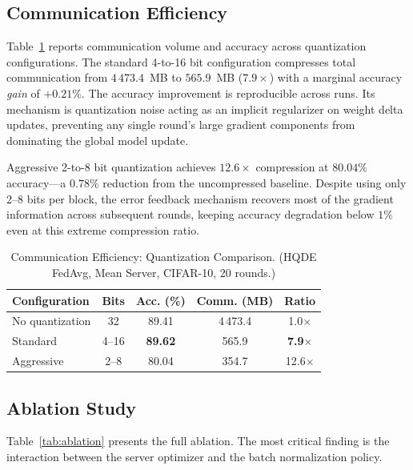 \documentclass[journal,twoside]{IEEEtran}
\newcommand{\hqde}{\mbox{HQDE}\xspace}
\begin{document}
\subsection{Communication Efficiency}
\label{sec:comm}

Table~\ref{tab:quant} reports communication volume and accuracy across
quantization configurations. The standard 4-to-16 bit configuration
compresses total communication from $4\,473.4$~MB to $565.9$~MB
($7.9\times$) with a marginal accuracy \emph{gain} of $+0.21\%$. The
accuracy improvement is reproducible across runs. Its mechanism is
quantization noise acting as an implicit regularizer on weight delta
updates, preventing any single round's large gradient components from
dominating the global model update.

Aggressive 2-to-8 bit quantization achieves $12.6\times$ compression
at $80.04\%$ accuracy---a $0.78\%$ reduction from the uncompressed
baseline. Despite using only 2--8 bits per block, the error feedback
mechanism recovers most of the gradient information across subsequent
rounds, keeping accuracy degradation below $1\%$ even at this extreme
compression ratio.

\begin{table}[!t]
\caption{Communication Efficiency: Quantization Comparison.
(\hqde{} FedAvg, Mean Server, CIFAR-10, 20 rounds.)}
\label{tab:quant}
\centering
\small
\renewcommand{\arraystretch}{1.25}
\setlength{\tabcolsep}{4pt}
\begin{tabular}{lcccc}
\toprule
\textbf{Configuration} & \textbf{Bits} & \textbf{Acc.} (\%) & \textbf{Comm.} (MB) & \textbf{Ratio} \\
\midrule
No quantization  & 32   & 89.41          & 4\,473.4 & 1.0$\times$ \\
Standard         & 4--16 & \textbf{89.62} & 565.9    & \textbf{7.9$\times$} \\
Aggressive       & 2--8  & 80.04          & 354.7    & 12.6$\times$ \\
\bottomrule
\end{tabular}
\end{table}

\subsection{Ablation Study}
\label{sec:ablation}

Table~\ref{tab:ablation} presents the full ablation. The most critical
finding is the interaction between the server optimizer and the batch
normalization policy.
\end{document}
